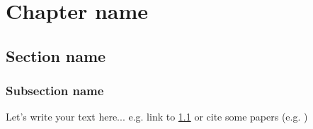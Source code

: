 \chapter{Chapter name}		
	\section{Section name}
	\label{secname}
		\subsection{Subsection name}
		\label{subsecname}
		 Let's write your text here... e.g. link to \ref{secname} or cite some papers (e.g. \cite{krizhevsky2012imagenet})